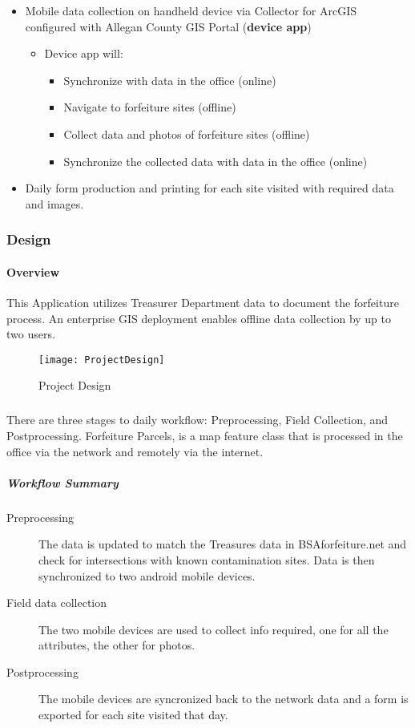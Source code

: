 \documentclass[class=article , crop=false, titlepage, twoside, multi={itemize, figure, verbatim}, float=false]{standalone}
\begin{document}
\begin{itemize} %

\item Mobile data collection on handheld device via Collector for ArcGIS configured with Allegan County GIS Portal  (\textbf{device app})

\begin{itemize} %

\item Device app will:

\begin{itemize} %

\item Synchronize with data in the office (online)
\item Navigate to forfeiture sites (offline)
\item Collect data and photos of forfeiture sites (offline)
\item Synchronize the collected data with data in the office (online)
\end{itemize} %

\end{itemize} %

\item Daily form production and printing for each site visited with required data and images.

\end{itemize} %

\clearpage
\subsubsection{Design}
\paragraph{Overview}This Application utilizes Treasurer Department data to document the forfeiture process.  An enterprise GIS deployment enables offline data collection by up to two users.
\begin{figure}[h!]
\centering
    \texttt{[image: ProjectDesign]}
\caption{Project Design}
\end{figure}
\subparagraph*{}There are three stages to daily workflow: Preprocessing, Field Collection, and Postprocessing.  Forfeiture Parcels, is a map feature class that is processed in the office via the network and remotely via the internet.
\clearpage
\subparagraph{Workflow Summary}
\begin{description}
\item [Preprocessing] The data is updated to match the Treasures data in BSAforfeiture.net and check for intersections with known contamination sites.  Data is then synchronized to two android mobile devices.
\item [Field data collection] The two mobile devices are used to collect info required, one for all the attributes, the other for photos.
\item[Postprocessing] The mobile devices are syncronized back to the network data and a form is exported for each site visited that day.
\end{description}
\end{document}
